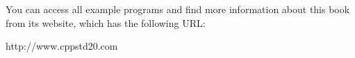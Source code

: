 You can access all example programs and find more information about this book from its website, which has the following URL:

http://www.cppstd20.com










